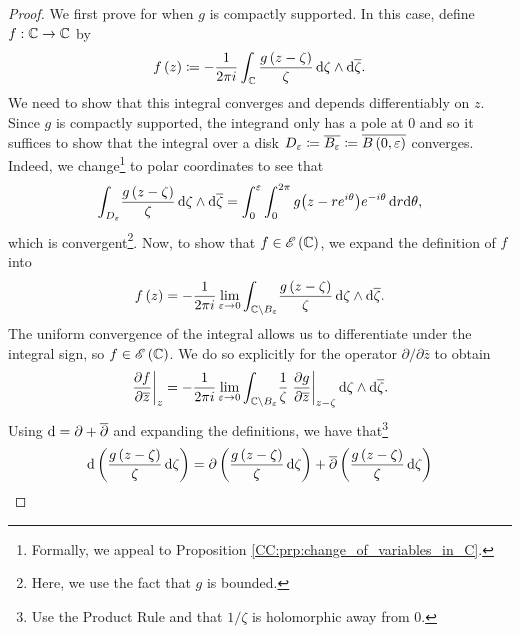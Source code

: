 \documentclass[../Moduli_Spaces_of_Riemann_Surfaces.tex]{subfiles}
\begin{document}
    \begin{proof}
        We first prove for when $g$ is compactly supported. In this case, define $f:\mathbb{C}\to\mathbb{C}$ by
        \begin{equation*}
            f\left(z\right)\coloneqq-\frac{1}{2\pi i}\int_{\mathbb{C}}\frac{g\left(z-\zeta\right)}{\zeta}\,\mathrm{d}\zeta\wedge\mathrm{d}\overline{\zeta}.
        \end{equation*}
        We need to show that this integral converges and depends differentiably on $z$. Since $g$ is compactly supported, the integrand only has a pole at $0$ and so it suffices to show that the integral over a disk $D_\varepsilon\coloneqq\overline{B_\varepsilon}\coloneqq\overline{B\left(0,\varepsilon\right)}$ converges. Indeed, we change\footnote{Formally, we appeal to Proposition \ref{CC:prp:change_of_variables_in_C}.} to polar coordinates to see that
        \begin{equation*}
            \int_{ D_\varepsilon}\!\frac{g\left(z-\zeta\right)}{\zeta}\,\mathrm{d}\zeta\wedge\mathrm{d}\overline{\zeta}=\int_{0}^{\varepsilon}\int_{0}^{2\pi}g\big(z-re^{i\theta}\big)e^{-i\theta}\,\mathrm{d} r\mathrm{d}\theta,
        \end{equation*}
        which is convergent\footnote{Here, we use the fact that $g$ is bounded.}. Now, to show that $f\in\mathscr{E}\left(\mathbb{C}\right)$, we expand the definition of $f$ into
        \begin{equation*}
            f\left(z\right)=-\frac{1}{2\pi i}\lim\limits_{\varepsilon\to0}\int_{\mathbb{C}\setminus B_\varepsilon}\!\frac{g\left(z-\zeta\right)}{\zeta}\,\mathrm{d}\zeta\wedge\mathrm{d}\overline{\zeta}.
        \end{equation*}
        The uniform convergence of the integral allows us to differentiate under the integral sign, so $f\in\mathscr{E}\left(\mathbb{C}\right)$. We do so explicitly for the operator $\partial/\partial\bar{z}$ to obtain
        \begin{equation*}
            \left.\frac{\partial f}{\partial\overline{z}}\right|_z=-\frac{1}{2\pi i}\lim\limits_{\varepsilon\to0}\int_{\mathbb{C}\setminus B_\varepsilon}\!\frac{1}{\zeta}\left.\frac{\partial g}{\partial\overline{z}}\right|_{z-\zeta}\mathrm{d}\zeta\wedge\mathrm{d}\overline{\zeta}.
        \end{equation*}
        Using $\mathrm{d}=\partial+\overline{\partial}$ and expanding the definitions, we have that\footnote{Use the Product Rule and that $1/\zeta$ is holomorphic away from $0$.}
        \begin{equation*}
            \begin{aligned}
                \d\l(\frac{g\l(z-\zeta\r)}{\zeta}\,\d\zeta\r)&=\partial\l(\frac{g\l(z-\zeta\r)}{\zeta}\,\d\zeta\r)+\bar{\partial}\l(\frac{g\l(z-\zeta\r)}{\zeta}\,\d\zeta\r) \\

\end{aligned}
\end{equation*}
\end{proof}
\end{document}

